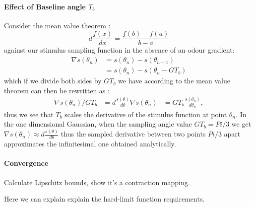 \documentclass[10pt,a4paper]{article}
\begin{document}
\paragraph{Effect of Baseline angle $T_b$}
Consider the mean value theorem :
\begin{equation}
d\frac{f(x)}{dx} = \frac{f(b) - f(a)}{b-a}
\end{equation}
against our stimulus sampling function in the absence of an odour gradient:
\begin{align}
\nabla s(\theta_n) &= s(\theta_n) - s(\theta_{n-1})\\
				   &= s(\theta_n) - s(\theta_{n} - G T_b)
\end{align}
which if we divide both sides by $G T_b$ we have  according to the mean value theorem can then be rewritten as :
\begin{align}
\nabla s(\theta_n)/G T_b &= d\frac{s(\theta)}{d\theta}
 \nabla s(\theta_n) &= G T_b \frac{s(\theta_n)}{d\theta_n},
\end{align}
thus we see that $T_b$ scales the derivative of the stimulus function at point $\theta_n$. In the one dimensional Gaussian, when the sampling angle value $G T_b = Pi/3$ we get $\nabla s(\theta_n) \approx d\frac{s(\theta)}{d\theta}$ thus the sampled derivative between two points $Pi/3$ apart approximates the infinitesimal one obtained analytically.


\paragraph{Convergence}
Calculate Lipschitz bounds, show it's a contraction mapping.

Here we can explain explain the hard-limit function requirements.
\end{document}
